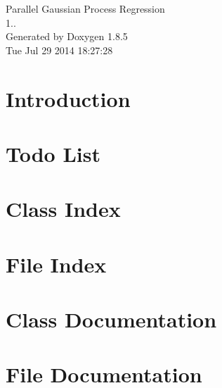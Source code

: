 \documentclass[twoside]{book}
\newcommand{\clearemptydoublepage}{%
  \newpage{\pagestyle{empty}\cleardoublepage}%
}
\begin{document}
\hypersetup{pageanchor=false}
\begin{titlepage}
\vspace*{7cm}
\begin{center}%
{\Large Parallel Gaussian Process Regression \\[1ex]\large 1.. }\\
\vspace*{1cm}
{\large Generated by Doxygen 1.8.5}\\
\vspace*{0.5cm}
{\small Tue Jul 29 2014 18:27:28}\\
\end{center}
\end{titlepage}
\clearemptydoublepage
\tableofcontents
\clearemptydoublepage
{}
\hypersetup{pageanchor=true}

\chapter{Introduction}
\label{index}\hypertarget{index}{}
\chapter{Todo List}
\label{todo}
\hypertarget{todo}{}

\chapter{Class Index}

\chapter{File Index}

\chapter{Class Documentation}



















\chapter{File Documentation}













\newpage
{}
{}
\printindex
\end{document}
